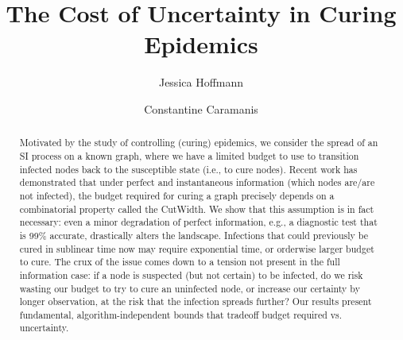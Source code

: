 \documentclass[letterpaper, 11pt]{article}
\begin{document}
	\title{The Cost of Uncertainty in Curing Epidemics}
	
	\author{Jessica Hoffmann \and Constantine Caramanis}
	\maketitle
		
	\begin{abstract}
		Motivated by the study of controlling (curing) epidemics, we consider the spread of an SI process on a known graph, where we have a limited budget to use to transition infected nodes back to the susceptible state (i.e., to cure nodes). Recent work has demonstrated that under perfect and instantaneous information (which nodes are/are not infected), the budget required for curing a graph precisely depends on a combinatorial property called the {\sc CutWidth}. We show that this assumption is in fact necessary: even a minor degradation of perfect information, e.g., a diagnostic test that is 99\% accurate, drastically alters the landscape. Infections that could previously be cured in sublinear time now may require exponential time, or orderwise larger budget to cure. The crux of the issue comes down to a tension not present in the full information case: if a node is suspected (but not certain) to be infected, do we risk wasting our budget to try to cure an uninfected node, or increase our certainty by longer observation, at the risk that the infection spreads further? Our results present fundamental, algorithm-independent bounds that tradeoff budget required vs. uncertainty. 
	\end{abstract}
	
	
	
	
	

	
	
	
	
	
	
	
	
	
	
	
	
	\newpage
	\newpage
	\balance
	
	 
	
	\pagebreak
	\nobalance
	
	
\end{document}
